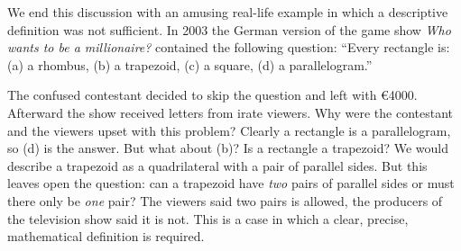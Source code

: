 We end this discussion with an amusing real-life example in which a descriptive definition was not sufficient. In 2003 the German version of the game show \emph{Who wants to be a millionaire?} contained the following question: ``Every rectangle is: (a) a rhombus, (b) a trapezoid, (c) a square, (d) a parallelogram.'' 

The confused contestant decided to skip the question and left with \euro 4000. Afterward the show received letters from irate viewers. Why were the contestant and the viewers upset with this problem? Clearly a rectangle is a parallelogram, so (d) is the answer. But what about (b)? Is a rectangle a trapezoid? We would describe a trapezoid as a quadrilateral with a pair of parallel sides. But this leaves open the question: can a trapezoid have \emph{two} pairs of parallel sides or must there only be \emph{one} pair? The viewers said two pairs is allowed, the producers of the television show said it is not. This is a case in which a clear, precise, mathematical definition is required.